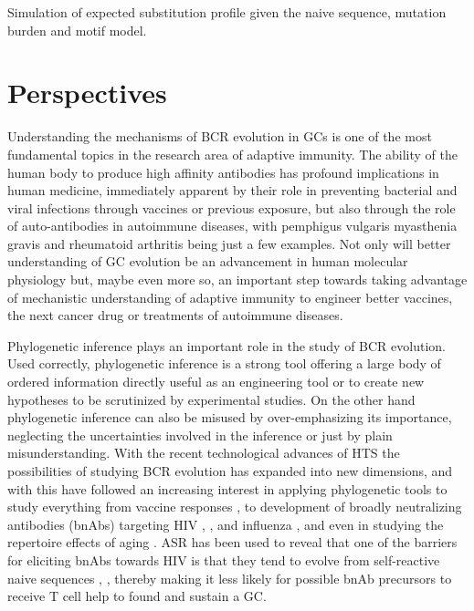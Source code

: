 Simulation of expected substitution profile given the naive sequence, mutation burden and motif model.








\fi


\chapter{Perspectives}
Understanding the mechanisms of BCR evolution in GCs is one of the most fundamental topics in the research area of adaptive immunity.
The ability of the human body to produce high affinity antibodies has profound implications in human medicine, immediately apparent by their role in preventing bacterial and viral infections through vaccines or previous exposure, but also through the role of auto-antibodies in autoimmune diseases, with pemphigus vulgaris \cite{payne2005genetic} myasthenia gravis \cite{lindstrom1998antibody} and rheumatoid arthritis \cite{steiner2002autoantibodies} being just a few examples.
Not only will better understanding of GC evolution be an advancement in human molecular physiology but, maybe even more so, an important step towards taking advantage of mechanistic understanding of adaptive immunity to engineer better vaccines, the next cancer drug or treatments of autoimmune diseases.

Phylogenetic inference plays an important role in the study of BCR evolution.
Used correctly, phylogenetic inference is a strong tool offering a large body of ordered information directly useful as an engineering tool or to create new hypotheses to be scrutinized by experimental studies.
On the other hand phylogenetic inference can also be misused by over-emphasizing its importance, neglecting the uncertainties involved in the inference or just by plain misunderstanding.
With the recent technological advances of HTS the possibilities of studying BCR evolution has expanded into new dimensions, and with this have followed an increasing interest in applying phylogenetic tools to study everything from vaccine responses \cite{raymond2016influenza}, to development of broadly neutralizing antibodies (bnAbs) targeting HIV \cite{Doria-Rose2014-vi}, \cite{Wu2011-yj}, \cite{Zhu_undated-zz} and influenza \cite{pappas2014rapid}, \cite{xu2015key} and even in studying the repertoire effects of aging \cite{de2017phylogenetic}.
ASR has been used to reveal that one of the barriers for eliciting bnAbs towards HIV is that they tend to evolve from self-reactive naive sequences \cite{williams2017potent}, \cite{liao2011initial}, thereby making it less likely for possible bnAb precursors to receive T cell help to found and sustain a GC.

